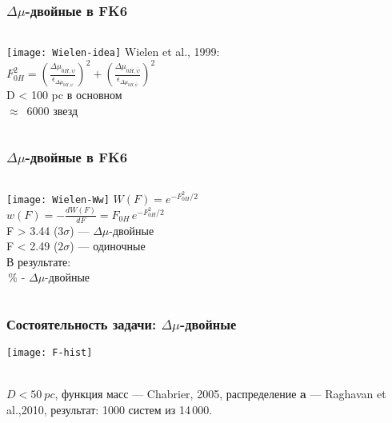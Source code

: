 \begin{frame}%
\frametitle{$\Delta\mu$-двойные в FK6}
\begin{columns}
		\texttt{[image: Wielen-idea]}
		{\footnotesize Wielen et al., 1999:}\\
		{\footnotesize $F^{2}_{0H} =\left(\frac{\Delta\mu_{0H,\psi}}{\epsilon_{\Delta\mu_{0H,\psi}}}\right)^{2}+\left(\frac{\Delta\mu_{0H,\bar{\psi}}}{\epsilon_{\Delta\mu_{0H,\bar{\psi}}}}\right)^{2}$}\\
		{\footnotesize D < 100 pc в основном \\ $\approx$~6000 звезд}\\
\end{columns}
\end{frame}

\begin{frame}%
\frametitle{$\Delta\mu$-двойные в FK6}
\begin{columns}
		\texttt{[image: Wielen-Ww]}
		{\footnotesize $W(F) = e^{-F^2_{0H}/2}$}\\
		{\footnotesize $w(F) = -\frac{dW(F)}{dF} = F_{0H}\,e^{-F^2_{0H}/2}$}\\
		{\footnotesize F > 3.44 ($3\sigma$) --- $\Delta\mu$-двойные}\\
		{\footnotesize F < 2.49 ($2\sigma$) --- одиночные}\\
		{\footnotesize В результате:\\ \,\%  - $\Delta\mu$-двойные}\\
\end{columns}
\end{frame}


\begin{frame}%
\frametitle{Состоятельность задачи: {\small $\Delta\mu$-двойные}}
\begin{center}
\texttt{[image: F-hist]}
\end{center}
\begin{center}
{\footnotesize \\ $D<50~pc$, функция масс --- Chabrier, 2005, распределение \textbf{a} --- Raghavan et al.,2010, результат: 1000 систем из 14\,000.}
\end{center}
\end{frame}

